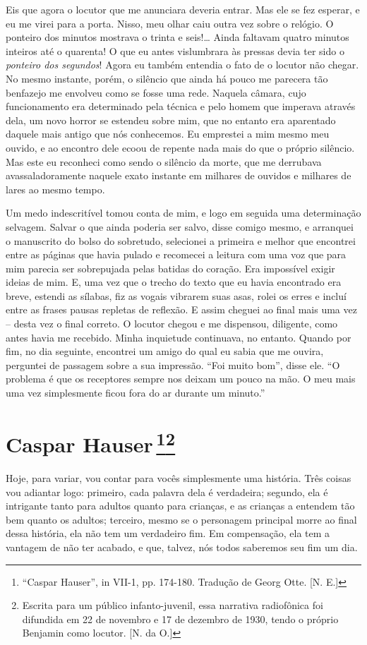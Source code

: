Eis que agora o locutor que me anunciara deveria entrar. Mas ele se fez
esperar, e eu me virei para a porta. Nisso, meu olhar caiu outra vez
sobre o relógio. O ponteiro dos minutos mostrava o trinta e seis!\ldots{}
Ainda faltavam quatro minutos inteiros até o quarenta! O que eu antes
vislumbrara às pressas devia ter sido o \emph{ponteiro dos segundos}!
Agora eu também entendia o fato de o locutor não chegar. No mesmo
instante, porém, o silêncio que ainda há pouco me parecera tão benfazejo
me envolveu como se fosse uma rede. Naquela câmara, cujo funcionamento
era determinado pela técnica e pelo homem que imperava através dela, um
novo horror se estendeu sobre mim, que no entanto era aparentado daquele
mais antigo que nós conhecemos. Eu emprestei a mim mesmo meu ouvido, e
ao encontro dele ecoou de repente nada mais do que o próprio silêncio.
Mas este eu reconheci como sendo o silêncio da morte, que me derrubava
avassaladoramente naquele exato instante em milhares de ouvidos e
milhares de lares ao mesmo tempo.

Um medo indescritível tomou conta de mim, e logo em seguida uma
determinação selvagem. Salvar o que ainda poderia ser salvo, disse
comigo mesmo, e arranquei o manuscrito do bolso do sobretudo, selecionei
a primeira e melhor que encontrei entre as páginas que havia pulado e
recomecei a leitura com uma voz que para mim parecia ser sobrepujada
pelas batidas do coração. Era impossível exigir ideias de mim. E, uma
vez que o trecho do texto que eu havia encontrado era breve, estendi as
sílabas, fiz as vogais vibrarem suas asas, rolei os erres e incluí entre
as frases pausas repletas de reflexão. E assim cheguei ao final mais uma
vez -- desta vez o final correto. O locutor chegou e me dispensou,
diligente, como antes havia me recebido. Minha inquietude continuava, no
entanto. Quando por fim, no dia seguinte, encontrei um amigo do qual eu
sabia que me ouvira, perguntei de passagem sobre a sua impressão. ``Foi
muito bom'', disse ele. ``O problema é que os receptores sempre nos
deixam um pouco na mão. O meu mais uma vez simplesmente ficou fora do ar
durante um minuto.''

\chapter{Caspar Hauser\,\footnote{``Caspar Hauser'', in  VII-1, pp.
  174-180. Tradução de Georg Otte. [N. E.]}\footnote{Escrita
  para um público infanto-juvenil, essa narrativa radiofônica foi
  difundida em 22 de novembro e 17 de dezembro de 1930, tendo o próprio
  Benjamin como locutor. [N. da O.]} }
Hoje, para variar, vou contar para vocês simplesmente uma história. Três
coisas vou adiantar logo: primeiro, cada palavra dela é verdadeira;
segundo, ela é intrigante tanto para adultos quanto para crianças, e as
crianças a entendem tão bem quanto os adultos; terceiro, mesmo se o
personagem principal morre ao final dessa história, ela não tem um
verdadeiro fim. Em compensação, ela tem a vantagem de não ter acabado, e
que, talvez, nós todos saberemos seu fim um dia.

